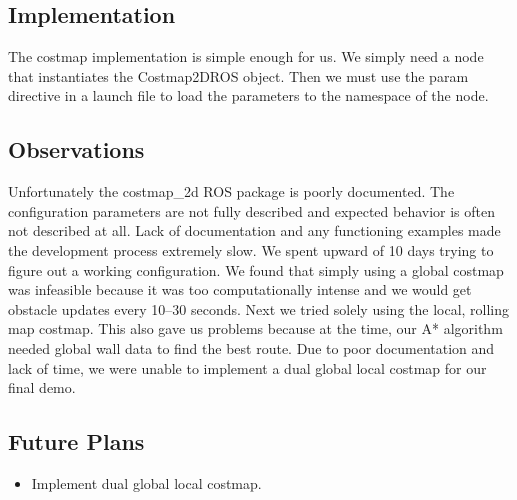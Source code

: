 \subsection{Implementation}

The costmap implementation is simple enough for us. We simply need a node that
instantiates the Costmap2DROS object. Then we must use the param directive in a 
launch file to load the parameters to the namespace of the node.

\subsection{Observations}

Unfortunately the costmap\_2d ROS package is poorly documented. The 
configuration parameters are not fully described and expected behavior is often 
not described at all. Lack of documentation and any functioning examples made 
the development process extremely slow. We spent upward of 10 days trying to 
figure out a working configuration. 
We found that simply using a global costmap was infeasible because it was too 
computationally intense and we would get obstacle updates every 10--30 
seconds. Next we tried solely using the local, rolling map costmap. This also 
gave us problems because at the time, our A* algorithm needed global wall data 
to find the best route. Due to poor documentation and lack of time, we were 
unable to implement a dual global local costmap for our final demo.

\subsection{Future Plans}

\begin{itemize}
	\item
		Implement dual global local costmap.
\end{itemize}
